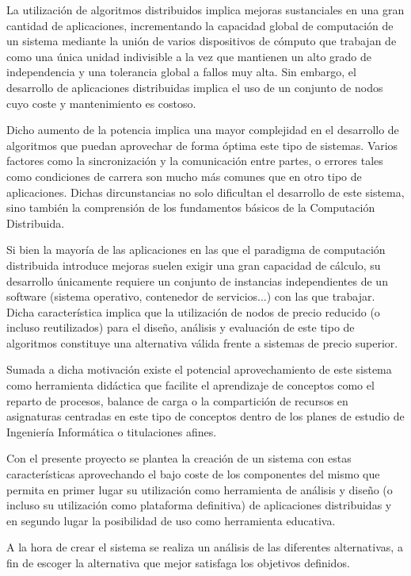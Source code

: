 La utilización de algoritmos distribuidos implica mejoras sustanciales en una gran cantidad de aplicaciones, incrementando la capacidad global de computación de un sistema mediante la unión de varios dispositivos de cómputo que trabajan de como una única unidad indivisible a la vez que mantienen un alto grado de independencia y una tolerancia global a fallos muy alta. Sin embargo, el desarrollo de aplicaciones distribuidas implica el uso de un conjunto de nodos cuyo coste y mantenimiento es costoso.

Dicho aumento de la potencia implica una mayor complejidad en el desarrollo de algoritmos que puedan aprovechar de forma óptima este tipo de sistemas. Varios factores como la sincronización y la comunicación entre partes, o errores tales como condiciones de carrera son mucho más comunes que en otro tipo de aplicaciones. Dichas dircunstancias no solo dificultan el desarrollo de este sistema, sino también la comprensión de los fundamentos básicos de la Computación Distribuida. %

Si bien la mayoría de las aplicaciones en las que el paradigma de computación distribuida introduce mejoras suelen exigir una gran capacidad de cálculo, su desarrollo únicamente requiere un conjunto de instancias independientes de un software (sistema operativo, contenedor de servicios...) con las que trabajar. Dicha característica implica que la utilización de nodos de precio reducido (o incluso reutilizados) para el diseño, análisis y evaluación de este tipo de algoritmos constituye una alternativa válida frente a sistemas de precio superior.

Sumada a dicha motivación existe el potencial aprovechamiento de este sistema como herramienta didáctica que facilite el aprendizaje de conceptos como el reparto de procesos, balance de carga o la compartición de recursos en asignaturas centradas en este tipo de conceptos dentro de los planes de estudio de Ingeniería Informática o titulaciones afines.

Con el presente proyecto se plantea la creación de un sistema con estas características aprovechando el bajo coste de los componentes del mismo que permita en primer lugar su utilización como herramienta de análisis y diseño (o incluso su utilización como plataforma definitiva) de aplicaciones distribuidas y en segundo lugar la posibilidad de uso como herramienta educativa.

A la hora de crear el sistema se realiza un análisis de las diferentes alternativas, a fin de escoger la alternativa que mejor satisfaga los objetivos definidos.

